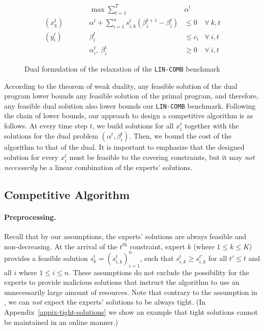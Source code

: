 \begin{figure}[ht]
	\begin{mdframed}
		\begin{align*}
			&& \max \sum_{t=1}^{T} & \alpha^{t} \\
			(x_{k}^{t}) \qquad && \alpha^{t} + \sum_{i=1}^{n} s_{i,k}^{t} ( \beta_{i}^{t+1} - \beta_{i}^{t})   &\leq 0  &\forall\ k,t\\
			(y_{i}^{t}) \qquad && \beta_{i}^{t}   &\leq c_{i}  &\forall\ i,t \\
			&& \alpha_{i}^{t},\ \beta_{i}^{t} & \ge 0 & \forall\ i,t
		\end{align*}
	\end{mdframed}
	\caption{Dual formulation of the relaxation of the \texttt{LIN-COMB} benchmark}
	\label{fig:dual}
\end{figure}


According to the theorem of weak duality, any feasible solution of the dual program lower bounds any feasible solution of the primal program, and therefore, any feasible dual solution also lower bounds our \texttt{LIN-COMB} benchmark. Following the chain of lower bounds, our approach to design a competitive algorithm is as follows. At every time step $t$, we build solutions for all $x_{i}^{t}$ together with the solutions for the dual problem $(\alpha^{t}, \beta_{i}^{t})$. Then, we bound the cost of the algorithm to that of the dual. It is important to emphasize that the designed solution for every $x_{i}^{t}$ must be feasible to the covering constraints, but it may \emph{not necessarily} be a linear combination of the experts' solutions.

\subsection{Competitive Algorithm} \label{sec:algo}

\paragraph{Preprocessing.}
Recall that by our assumptions, the experts' solutions are always feasible and non-decreasing. At the arrival of the $t^{\text{th}}$ constraint, expert $k$ (where $1 \leq k \leq K$) provides a feasible solution $s_{k}^{t} = (s_{i,k}^{t})_{i=1}^{n}$, such that $s_{i,k}^{t} \ge s_{i,k}^{t'}$ for all $t' \le t$ and all $i$ where $1 \le i \le n$. These assumptions do not exclude the possibility for the experts to provide malicious solutions that instruct the algorithm to use an unnecessarily large amount of resources.
Note that contrary to the assumption in \cite{AnandGe22:Online-Algorithms}, we can \emph{not} expect the experts' solutions to be always tight.
(In Appendix~\ref{appix-tight-solutions}
we show an example that tight solutions cannot be maintained in an online manner.)


